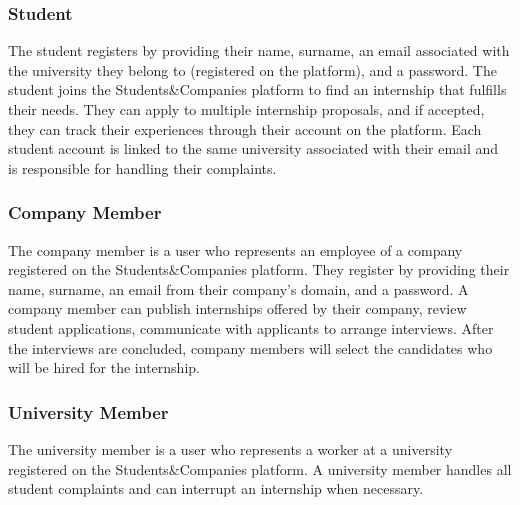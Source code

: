 \subsubsection{Student}
The student registers by providing their name, surname, an email associated with the university they belong to (registered on the platform), and a password. The student joins the Students\&Companies platform to find an internship that fulfills their needs. 
They can apply to multiple internship proposals, and if accepted, they can track their experiences through their account on the platform. Each student account is linked to 
the same university associated with their email and is responsible for handling their complaints.

\subsubsection{Company Member}
The company member is a user who represents an employee of a company registered on the Students\&Companies platform. 
They register by providing their name, surname, an email from their company's domain, and a password. A company member can publish internships offered by their company, 
review student applications, communicate with applicants to arrange interviews. After the interviews are concluded, company members will select the candidates who will be 
hired for the internship.

\subsubsection{University Member}
The university member is a user who represents a worker at a university registered on the Students\&Companies platform. A university member handles all student 
complaints and can interrupt an internship when necessary.


